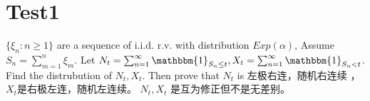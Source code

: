 \documentclass[main]{subfiles}
\begin{document}
\section{Test1}%
\begin{problem}\label{pro:1}
  \(\{\xi_n: n \geq 1\}\) are a sequence of i.i.d. r.v. with distribution \(Exp(\alpha)\),
  Assume \(S_n=\sum_{m=1}^{n} \xi_m\).
  Let \(N_t=\sum_{n = 1}^{\infty} \mathbbm{1}_{S_n \leq t}, X_t = \sum_{n=1}^{\infty} \mathbbm{1}_{S_n < t}\).
  Find the distrubution of \(N_t,X_t\). Then prove that \(N_t\) is 左极右连，随机右连续 ，
  \(X_t\)是右极左连，随机左连续。
  \(N_t,X_t\) 是互为修正但不是无差别。
\end{problem}
\begin{problem}\label{pro:2}

\end{problem}
\end{document}
